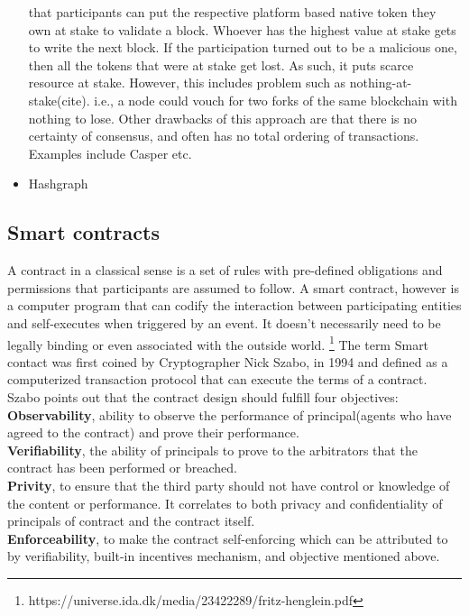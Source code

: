 \begin{itemize}
		that participants can put the respective platform based native token
		they own at stake to validate a block. Whoever has the highest value at
		stake gets to write the next block. If the participation turned out to
		be a malicious one, then all the tokens that were at stake get lost. As
		such, it puts scarce resource at stake. However, this includes problem
		such as nothing-at-stake(cite). i.e., a node could vouch for two forks
		of the same blockchain with nothing to lose. Other drawbacks of this
		approach are that there is no certainty of consensus, and often has no
		total ordering of transactions. Examples include Casper etc. 
	\item Hashgraph
\end{itemize}

\subsection{Smart contracts}
A contract in a classical sense is a set of rules with pre-defined obligations
and permissions that participants are assumed to follow. 
A smart contract, however is a computer program that can codify the
interaction between participating entities and self-executes when triggered by
an event. It doesn't necessarily need to be legally binding or even associated
with the outside world. 
\footnote{https://universe.ida.dk/media/23422289/fritz-henglein.pdf}
The term Smart contact was first coined by Cryptographer Nick Szabo, in 1994
\cite{SzaboSmart1994} and defined as a computerized transaction protocol that
can execute the terms of a contract. Szabo points out that the contract
design should fulfill four objectives\cite{szabo1996smart}: \\
\textbf{Observability}, ability to observe the performance of principal(agents
who have agreed to the contract) and prove their performance.\\
\textbf{Verifiability}, the ability of principals to prove to the arbitrators
that the contract has been performed or breached. \\ 
\textbf{Privity}, to ensure that the third party should not have control or
knowledge of the content or performance. It correlates to both privacy and
confidentiality of principals of contract and the contract itself. \\
\textbf{Enforceability}, to make the contract self-enforcing which can be
attributed to by verifiability, built-in incentives mechanism, and objective
mentioned above. \\
